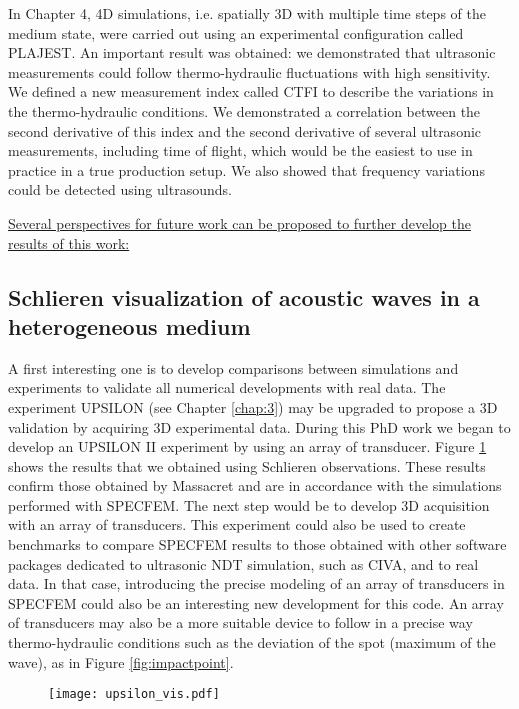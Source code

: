 In Chapter 4, 4D simulations, i.e. spatially 3D with multiple time steps of the medium state, were carried out using an experimental configuration called PLAJEST.
An important result was obtained: we demonstrated that ultrasonic measurements could follow thermo-hydraulic fluctuations with high sensitivity.
We defined a new measurement index called CTFI to describe the variations in the thermo-hydraulic conditions.
We demonstrated a correlation between the second derivative of this index and the second derivative of several ultrasonic measurements,
including time of flight, which would be the easiest to use in practice in a true production setup.
We also showed that frequency variations could be detected using ultrasounds.

\noindent
\underline{Several perspectives for future work can be proposed to further develop the results of this work:}

\subsection*{Schlieren visualization of acoustic waves in a heterogeneous medium}

A first interesting one is to develop comparisons between simulations and experiments to validate all numerical developments with real data.
The experiment UPSILON (see Chapter \ref{chap:3}) may be upgraded to propose a 3D validation by acquiring 3D experimental data.
During this PhD work we began to develop an UPSILON II experiment by using an array of transducer.
Figure \ref{fig:upsilon_vis} shows the results that we obtained using Schlieren observations.
These results confirm those obtained by Massacret and are in accordance with the simulations performed with SPECFEM.
The next step would be to develop 3D acquisition with an array of transducers.
This experiment could also be used to create benchmarks to compare SPECFEM results to those obtained with other software packages dedicated to ultrasonic NDT simulation,
such as CIVA, and to real data.
In that case, introducing the precise modeling of an array of transducers in SPECFEM could also be an interesting new development for this code.
An array of transducers may also be a more suitable device to follow in a precise way thermo-hydraulic conditions such as the deviation of the spot (maximum of the wave),
as in Figure \ref{fig:impactpoint}.

\begin{figure}[htbp]
    \centerline{\texttt{[image: upsilon\_vis.pdf]}}
    \label{fig:upsilon_vis}
\end{figure}


